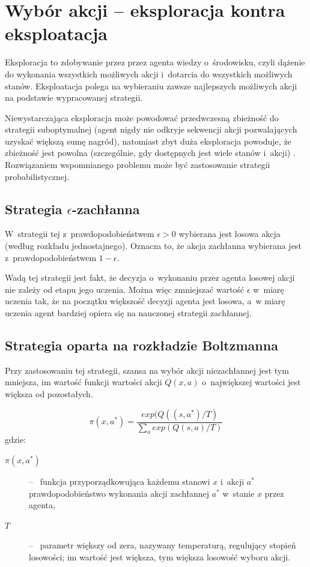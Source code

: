 \documentclass[a4paper, 12pt, oneside]{report}
\begin{document}
\section{Wybór akcji -- eksploracja kontra eksploatacja}
Eksploracja to zdobywanie przez przez agenta wiedzy o~środowisku, czyli dążenie do wykonania wszystkich możliwych akcji i~dotarcia do wszystkich możliwych stanów. Eksploatacja polega na wybieraniu zawsze najlepszych możliwych akcji na podstawie wypracowanej strategii.

Niewystarczająca eksploracja może powodować przedwczesną zbieżność do strategii suboptymalnej (agent nigdy nie odkryje sekwencji akcji pozwalających uzyskać większą sumę nagród), natomiast zbyt duża eksploracja powoduje, że zbieżność jest powolna (szczególnie, gdy dostępnych jest wiele stanów i~akcji) \cite{Cichosz00}. Rozwiązaniem wspomnianego problemu może być zastosowanie strategii probabilistycznej.

\subsection{Strategia $\epsilon$-zachłanna}
 W~strategii tej z~prawdopodobieństwem $\epsilon > 0$ wybierana jest losowa akcja (według rozkładu jednostajnego). Oznacza to, że akcja zachłanna wybierana jest z~prawdopodobieństwem $1-\epsilon$.

Wadą tej strategii jest fakt, że decyzja o~wykonaniu przez agenta losowej akcji nie zależy od etapu jego uczenia. Można więc zmniejszać wartość $\epsilon$ w~miarę uczenia tak, że na początku większość decyzji agenta jest losowa, a~w miarę uczenia agent bardziej opiera się na nauczonej strategii zachłannej.

\subsection{Strategia oparta na rozkładzie Boltzmanna}
\label{sec:boltzmann}
Przy zastosowaniu tej strategii, szansa na wybór akcji niezachłannej jest tym mniejsza, im wartość funkcji wartości akcji $Q(x, a)$ o~największej wartości jest większa od pozostałych.

\begin{equation}
\pi(x,a^{*}) = \frac{exp(Q((s,a^{*})/T)}{\sum_a exp(Q(s,a)/T)}
\end{equation}
gdzie:
\begin{description}
\item[$\pi(x,a^{*})$] -- \ funkcja przyporządkowująca każdemu stanowi $x$ i~akcji $a^{*}$ prawdopodobieństwo wykonania akcji zachłannej $a^{*}$ w~stanie $x$ przez agenta,
\item[$T$] -- \ parametr większy od zera, nazywany temperaturą, regulujący stopień losowości; im wartość jest większa, tym większa losowość wyboru akcji.
\end{description}
\end{document}
